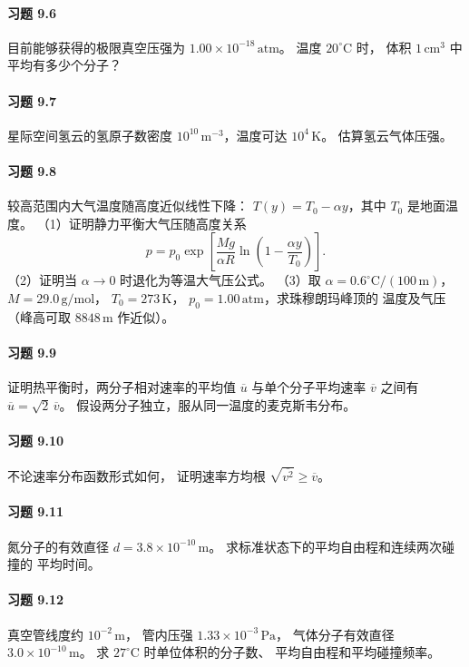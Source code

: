 \paragraph{习题 9.6}
目前能够获得的极限真空压强为
\(1.00\times10^{-18}\,\mathrm{atm}\)。
温度 \(20^\circ\mathrm C\) 时，
体积 \(1\,\mathrm{cm^3}\) 中平均有多少个分子？

\paragraph{习题 9.7}
星际空间氢云的氢原子数密度
\(10^{10}\,\mathrm{m^{-3}}\)，温度可达
\(10^4\,\mathrm K\)。
估算氢云气体压强。

\paragraph{习题 9.8}
较高范围内大气温度随高度近似线性下降：
\(T(y)=T_0-\alpha y\)，其中 \(T_0\) 是地面温度。
（1）证明静力平衡大气压随高度关系
\[
 p=p_0\exp\!\left[
 \frac{Mg}{\alpha R}\ln\!\left(1-\frac{\alpha y}{T_0}\right)
 \right].
\]
（2）证明当 \(\alpha\to0\) 时退化为等温大气压公式。
（3）取 \(\alpha=0.6^\circ\mathrm C/(100\,\mathrm m)\)，
\(M=29.0\,\mathrm{g/mol}\)，
\(T_0=273\,\mathrm K\)，
\(p_0=1.00\,\mathrm{atm}\)，求珠穆朗玛峰顶的
温度及气压（峰高可取 \(8848\,\mathrm m\) 作近似）。

\paragraph{习题 9.9}
证明热平衡时，两分子相对速率的平均值
\(\overline{u}\) 与单个分子平均速率
\(\overline v\) 之间有
\(\overline u=\sqrt2\,\overline v\)。
假设两分子独立，服从同一温度的麦克斯韦分布。

\paragraph{习题 9.10}
不论速率分布函数形式如何，
证明速率方均根
\(\sqrt{\overline{v^2}}\ge\overline v\)。

\paragraph{习题 9.11}
氮分子的有效直径
\(d=3.8\times10^{-10}\,\mathrm m\)。
求标准状态下的平均自由程和连续两次碰撞的
平均时间。

\paragraph{习题 9.12}
真空管线度约 \(10^{-2}\,\mathrm m\)，
管内压强 \(1.33\times10^{-3}\,\mathrm{Pa}\)，
气体分子有效直径 \(3.0\times10^{-10}\,\mathrm m\)。
求 \(27^\circ\mathrm C\) 时单位体积的分子数、
平均自由程和平均碰撞频率。

